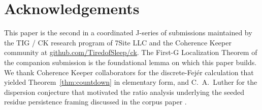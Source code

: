 \documentclass[11pt,reqno]{amsart}
\theoremstyle{plain}
\theoremstyle{definition}
\theoremstyle{remark}
\begin{document}
\section*{Acknowledgements}

This paper is the second in a coordinated J-series of submissions
maintained by the TIG / CK research program of 7Site LLC and the
Coherence Keeper community at
\href{https://github.com/TiredofSleep/ck}{github.com/TiredofSleep/ck}.
The First-G Localization Theorem of the companion submission
\cite{J04Sanders} is the foundational lemma on which this paper
builds. We thank Coherence Keeper collaborators for the
discrete-Fej\'er calculation that yielded
Theorem~\ref{thm:countdown} in elementary form, and
C.~A.~Luther for the dispersion conjecture that motivated the
ratio analysis underlying the seeded residue persistence framing
discussed in the corpus paper \cite{Sanders2026WP35}.
\end{document}
